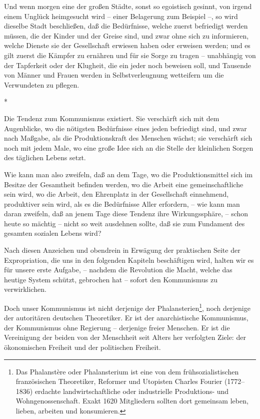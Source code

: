 \documentclass{scrbook}
\begin{document}
Und wenn morgen eine der großen Städte, sonst so egoistisch gesinnt, von irgend einem Unglück heimgesucht wird – einer Belagerung zum Beispiel –, so wird dieselbe Stadt beschließen, daß die Bedürfnisse, welche zuerst befriedigt werden müssen, die der Kinder und der Greise sind, und zwar ohne sich zu informieren, welche Dienste sie der Gesellschaft erwiesen haben oder erweisen werden; und es gilt zuerst die Kämpfer zu ernähren und für sie Sorge zu tragen – unabhängig von der Tapferkeit oder der Klugheit, die ein jeder noch beweisen soll, und Tausende von Männer und Frauen werden in Selbstverleugnung wetteifern um die Verwundeten zu pflegen.

\begin{center}*\end{center}

Die Tendenz zum Kommunismus existiert. Sie verschärft sich mit dem Augenblicke, wo die nötigsten Bedürfnisse eines jeden befriedigt sind, und zwar nach Maßgabe, als die Produktionskraft des Menschen wächst; sie verschärft sich noch mit jedem Male, wo eine große Idee sich an die Stelle der kleinlichen Sorgen des täglichen Lebens setzt.

Wie kann man also zweifeln, daß an dem Tage, wo die Produktionsmittel sich im Besitze der Gesamtheit befinden werden, wo die Arbeit eine gemeinschaftliche sein wird, wo die Arbeit, den Ehrenplatz in der Gesellschaft einnehmend, produktiver sein wird, als es die Bedürfnisse Aller erfordern, – wie kann man daran zweifeln, daß an jenem Tage diese Tendenz ihre Wirkungssphäre, – schon heute so mächtig – nicht so weit ausdehnen sollte, daß sie zum Fundament des gesamten sozialen Lebens wird?

Nach diesen Anzeichen und obendrein in Erwägung der praktischen Seite der Expropriation, die uns in den folgenden Kapiteln beschäftigen wird, halten wir es für unsere erste Aufgabe, – nachdem die Revolution die Macht, welche das heutige System schützt, gebrochen hat – sofort den Kommunismus zu verwirklichen.

Doch unser Kommunismus ist nicht derjenige der Phalansterien\footnote{Das Phalanstère oder Phalansterium ist eine von dem frühsozialistischen französischen Theoretiker, Reformer und Utopisten Charles Fourier (1772–1836) erdachte landwirtschaftliche oder industrielle Produktions- und Wohngenossenschaft. Exakt 1620 Mitgliedern sollten dort gemeinsam leben, lieben, arbeiten und konsumieren.}, noch derjenige der autoritären deutschen Theoretiker. Er ist der anarchistische Kommunismus, der Kommunismus ohne Regierung – derjenige freier Menschen. Er ist die Vereinigung der beiden von der Menschheit seit Alters her verfolgten Ziele: der ökonomischen Freiheit und der politischen Freiheit.
\end{document}
